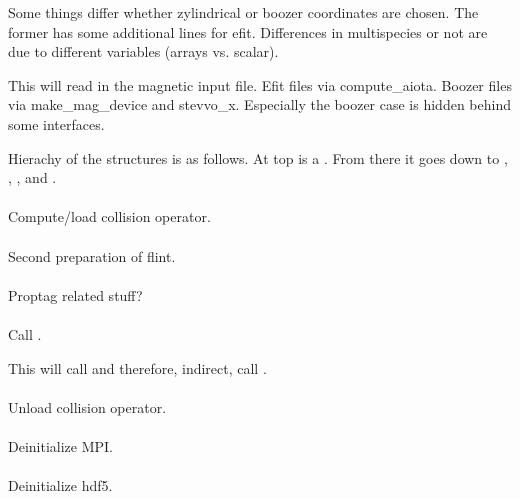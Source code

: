 Some things differ whether zylindrical or boozer coordinates are chosen.
The former has some additional lines for efit.
Differences in multispecies or not are due to different variables
(arrays vs. scalar).

This will read in the magnetic input file.
Efit files via compute\_aiota.
Boozer files via make\_mag\_device and stevvo\_x. Especially the boozer
case is hidden behind some interfaces.

Hierachy of the structures is as follows. At top is a .
From there it goes down to , ,
,  and
.

\paragraph{}
Compute/load collision operator.

\paragraph{}
Second preparation of flint.

\paragraph{}
Proptag related stuff?

\paragraph{}
Call .

This will call  and therefore,
indirect, call .

\paragraph{}
Unload collision operator.

\paragraph{}
Deinitialize MPI.

\paragraph{}
Deinitialize hdf5.
